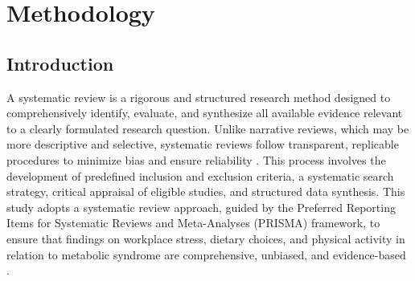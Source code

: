 \chapter{Methodology}
\section{Introduction}
A systematic review is a rigorous and structured research method designed to comprehensively identify, evaluate, and synthesize all available evidence relevant to a clearly formulated research question. Unlike narrative reviews, which may be more descriptive and selective, systematic reviews follow transparent, replicable procedures to minimize bias and ensure reliability \cite{higgins2011cochrane,liberati2009prisma}. This process involves the development of predefined inclusion and exclusion criteria, a systematic search strategy, critical appraisal of eligible studies, and structured data synthesis. This study adopts a systematic review approach, guided by the Preferred Reporting Items for Systematic Reviews and Meta-Analyses (PRISMA) framework, to ensure that findings on workplace stress, dietary choices, and physical activity in relation to metabolic syndrome are comprehensive, unbiased, and evidence-based \cite{moher2009,page2021prisma}.



